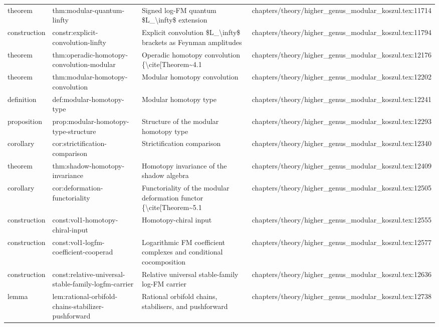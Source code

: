 \documentclass[11pt]{article}
\begin{document}
\begin{longtable}{L{0.10\textwidth}L{0.26\textwidth}L{0.42\textwidth}L{0.22\textwidth}}
theorem & thm:modular-quantum-linfty & Signed log-FM quantum \$L\_\textbackslash{}infty\$ extension & chapters/theory/higher\_genus\_modular\_koszul.tex:11714\\
construction & constr:explicit-convolution-linfty & Explicit convolution \$L\_\textbackslash{}infty\$ brackets as Feynman amplitudes & chapters/theory/higher\_genus\_modular\_koszul.tex:11794\\
theorem & thm:operadic-homotopy-convolution-modular & Operadic homotopy convolution \{\textbackslash{}cite[Theorem\textasciitilde{}4.1 & chapters/theory/higher\_genus\_modular\_koszul.tex:12176\\
theorem & thm:modular-homotopy-convolution & Modular homotopy convolution & chapters/theory/higher\_genus\_modular\_koszul.tex:12202\\
definition & def:modular-homotopy-type & Modular homotopy type & chapters/theory/higher\_genus\_modular\_koszul.tex:12241\\
proposition & prop:modular-homotopy-type-structure & Structure of the modular homotopy type & chapters/theory/higher\_genus\_modular\_koszul.tex:12293\\
corollary & cor:strictification-comparison & Strictification comparison & chapters/theory/higher\_genus\_modular\_koszul.tex:12340\\
theorem & thm:shadow-homotopy-invariance & Homotopy invariance of the shadow algebra & chapters/theory/higher\_genus\_modular\_koszul.tex:12409\\
corollary & cor:deformation-functoriality & Functoriality of the modular deformation functor \{\textbackslash{}cite[Theorem\textasciitilde{}5.1 & chapters/theory/higher\_genus\_modular\_koszul.tex:12505\\
construction & const:vol1-homotopy-chiral-input & Homotopy-chiral input & chapters/theory/higher\_genus\_modular\_koszul.tex:12555\\
construction & const:vol1-logfm-coefficient-cooperad & Logarithmic FM coefficient complexes and cond{}itional cocomposition & chapters/theory/higher\_genus\_modular\_koszul.tex:12577\\
construction & const:relative-universal-stable-family-logfm-carrier & Relative universal stable-family log-FM carrier & chapters/theory/higher\_genus\_modular\_koszul.tex:12636\\
lemma & lem:rational-orbifold-chains-stabilizer-pushforward & Rational orbifold chains, stabilisers, and pushforward & chapters/theory/higher\_genus\_modular\_koszul.tex:12738\\

\end{longtable}
\end{document}
